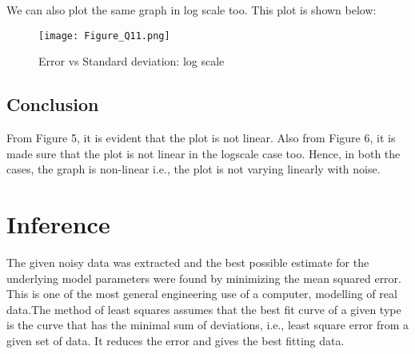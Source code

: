 \documentclass[11pt, a4paper]{article}
\begin{document}
We can also plot the same graph in log scale too. This plot is shown below:\\
 	\begin{figure}[!tbh]
   	\centering
   	\texttt{[image: Figure\_Q11.png]}   
   	\caption{Error vs Standard deviation: log scale}
   	\label{fig:sample}
   \end{figure} 
\subsection*{Conclusion}
From Figure 5, it is evident that the plot is not linear. Also from Figure 6, it is made sure that the plot is not linear in the logscale case too. Hence, in both the cases, the graph is non-linear i.e., the plot is not varying linearly with noise. 

\section*{Inference}
The given noisy data was extracted and the best possible estimate for the
underlying model parameters were found by minimizing the mean squared
error. This is one of the most general engineering use of a computer, modelling of real data.The method of least squares assumes that the best fit curve of a given type is the curve that has the minimal sum of deviations, i.e., least square error from a given set of data. It reduces the error and gives the best fitting data.
 
\end{document}
